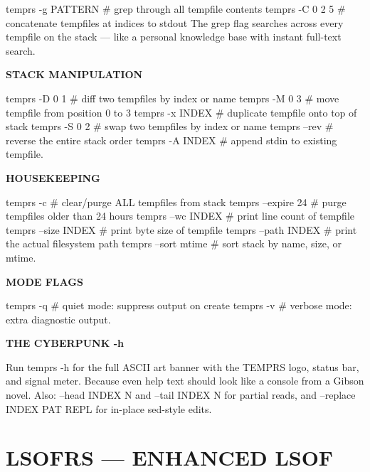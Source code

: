 \documentclass[11pt,a4paper,twoside]{book}
\begin{document}
temprs -g PATTERN   \# grep through all tempfile contents temprs -C 0 2 5    \# concatenate tempfiles at indices to stdout The grep flag searches across every tempfile on the stack — like a personal knowledge base with instant full-text search.


\vspace{12pt}
{\bfseries\color{neonyellow} STACK MANIPULATION}\vspace{4pt}

temprs -D 0 1      \# diff two tempfiles by index or name temprs -M 0 3      \# move tempfile from position 0 to 3 temprs -x INDEX     \# duplicate tempfile onto top of stack temprs -S 0 2      \# swap two tempfiles by index or name temprs --rev        \# reverse the entire stack order temprs -A INDEX     \# append stdin to existing tempfile.


\vspace{12pt}
{\bfseries\color{neonyellow} HOUSEKEEPING}\vspace{4pt}

temprs -c           \# clear/purge ALL tempfiles from stack temprs --expire 24  \# purge tempfiles older than 24 hours temprs --wc INDEX   \# print line count of tempfile temprs --size INDEX \# print byte size of tempfile temprs --path INDEX \# print the actual filesystem path temprs --sort mtime \# sort stack by name, size, or mtime.


\vspace{12pt}
{\bfseries\color{neonyellow} MODE FLAGS}\vspace{4pt}

temprs -q           \# quiet mode: suppress output on create temprs -v           \# verbose mode: extra diagnostic output.


\vspace{12pt}
{\bfseries\color{neonyellow} THE CYBERPUNK -h}\vspace{4pt}

Run temprs -h for the full ASCII art banner with the TEMPRS logo, status bar, and signal meter. Because even help text should look like a console from a Gibson novel. Also: --head INDEX N and --tail INDEX N for partial reads, and --replace INDEX PAT REPL for in-place sed-style edits.


\vspace{16pt}


\chapter{LSOFRS — ENHANCED LSOF}
\end{document}
